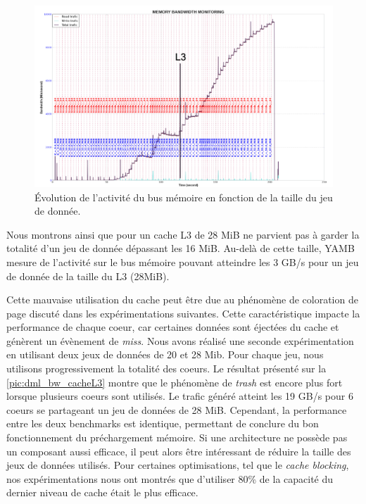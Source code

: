          \begin{figure}
        \center
        \includegraphics[width=14cm]{images/dml_L3_sharing.png}
        \caption{\label{pic:dml_L3_sharing} Évolution de l'activité du bus mémoire en fonction de la taille du jeu de donnée.}
        \end{figure}
        
        Nous montrons ainsi que pour un cache L3 de 28 MiB ne parvient pas à garder la totalité d'un jeu de donnée dépassant les 16 MiB. Au-delà de cette taille, YAMB mesure de l'activité sur le bus mémoire pouvant atteindre les 3 GB/s pour un jeu de donnée de la taille du L3 (28MiB). 
        
        
        Cette mauvaise utilisation du cache peut être due au phénomène de coloration de page discuté dans les expérimentations suivantes. Cette caractéristique impacte la performance de chaque coeur, car certaines données sont éjectées du cache et génèrent un évènement de \textit{miss}. Nous avons réalisé une seconde expérimentation en utilisant deux jeux de données de 20 et 28 Mib. Pour chaque jeu, nous utilisons progressivement la totalité des coeurs. Le résultat présenté sur la \autoref{pic:dml_bw_cacheL3} montre que le phénomène de \textit{trash} est encore plus fort lorsque plusieurs coeurs sont utilisés. Le trafic généré atteint les 19 GB/s pour 6 coeurs se partageant un jeu de données de 28 MiB. Cependant, la performance entre les deux benchmarks est identique, permettant de conclure du bon fonctionnement du préchargement mémoire. Si une architecture ne possède pas un composant aussi efficace, il peut alors être intéressant de réduire la taille des jeux de données utilisés. Pour certaines optimisations, tel que le \textit{cache blocking}, nos expérimentations nous ont montrés que d’utiliser 80\% de la capacité du dernier niveau de cache était le plus efficace.
        
